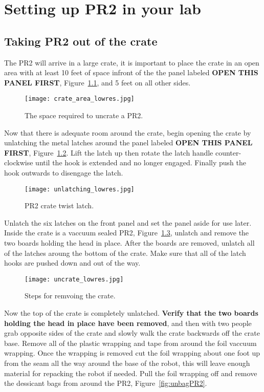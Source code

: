 \chapter{Setting up PR2 in your lab}
\section{Taking PR2 out of the crate}
The PR2 will arrive in a large crate, it is important to place the crate in an
open area with at least 10 feet of space infront of the the panel labeled {\bf
  OPEN THIS PANEL FIRST}, Figure~\ref{fig:crate_space}, and 5 feet on all other
sides.

\begin{figure}[h!]
\centering
\texttt{[image: crate\_area\_lowres.jpg]}
\caption{The space required to uncrate a PR2.}
\label{fig:crate_space}
\end{figure}

Now that there is adequate room around the crate, begin opening the crate by
unlatching the metal latches around the panel labeled {\bf OPEN THIS PANEL
  FIRST}, Figure~\ref{fig:unlatch}. Lift the latch up then rotate the latch
handle counter-clockwise until the hook is extended and no longer
engaged. Finally push the hook outwards to disengage the latch.

\begin{figure}[h]
\centering
\texttt{[image: unlatching\_lowres.jpg]}
\caption{PR2 crate twist latch.}
\label{fig:unlatch}
\end{figure}

Unlatch the six latches on the front panel and set the panel aside for use
later. Inside the crate is a vaccuum sealed PR2, Figure~\ref{fig:sealPR2},
unlatch and remove the two boards holding the head in place. After the boards
are removed, unlatch all of the latches aroung the bottom of the crate. Make
sure that all of the latch hooks are pushed down and out of the way.

\begin{figure}[h]
\centering
\texttt{[image: uncrate\_lowres.jpg]}
\caption{Steps for remvoing the crate.}
\label{fig:sealPR2}
\end{figure}

Now the top of the crate is completely unlatched. {\bf Verify that the two boards holding the head in place have been removed}, and then with two people grab opposite
sides of the crate and slowly walk the crate backwards off the crate
base. Remove all of the plastic wrapping and tape from around the foil vaccuum
wrapping. Once the wrapping is removed cut the foil wrapping about one foot up
from the seam all the way around the base of the robot, this will leave enough
material for repacking the robot if needed. Pull the foil wrapping off and
remove the dessicant bags from around the PR2, Figure~\ref{fig:unbagPR2}.

